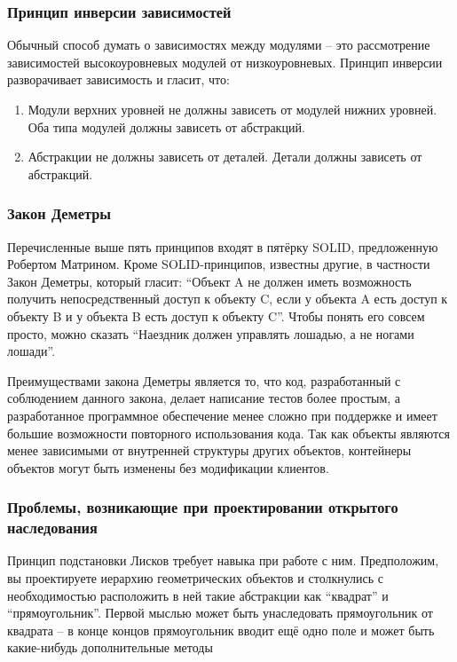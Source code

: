 \documentclass[a4paper,12pt,oneside]{article}
\begin{document}
\subsubsection{Принцип инверсии зависимостей}

Обычный способ думать о зависимостях между модулями -- это рассмотрение зависимостей высокоуровневых модулей от низкоуровневых. Принцип инверсии разворачивает зависимость и гласит, что:

\begin{enumerate}
\item Модули верхних уровней не должны зависеть от модулей нижних уровней. Оба типа модулей должны зависеть от абстракций.
\item Абстракции не должны зависеть от деталей. Детали должны зависеть от абстракций.
\end{enumerate}

\subsubsection{Закон Деметры}

Перечисленные выше пять принципов входят в пятёрку SOLID, предложенную Робертом Матрином. Кроме SOLID-принципов, известны другие, в частности Закон Деметры, который гласит: ``Объект A не должен иметь возможность получить непосредственный доступ к объекту C, если у объекта A есть доступ к объекту B и у объекта B есть доступ к объекту C''. Чтобы понять его совсем просто, можно сказать ``Наездник должен управлять лошадью, а не ногами лошади''.

Преимуществами закона Деметры является то, что код, разработанный с соблюдением данного закона, делает написание тестов более простым, а разработанное программное обеспечение менее сложно при поддержке и имеет большие возможности повторного использования кода. Так как объекты являются менее зависимыми от внутренней структуры других объектов, контейнеры объектов могут быть изменены без модификации клиентов.

\subsubsection{Проблемы, возникающие при проектировании открытого наследования}

Принцип подстановки Лисков требует навыка при работе с ним. Предположим, вы проектируете иерархию геометрических объектов и столкнулись с необходимостью расположить в ней такие абстракции как ``квадрат'' и ``прямоугольник''. Первой мыслью может быть унаследовать прямоугольник от квадрата – в конце концов прямоугольник вводит ещё одно поле и может быть какие-нибудь дополнительные методы
\end{document}
